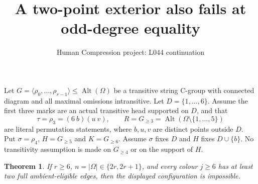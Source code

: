 \documentclass[11pt,a4paper]{article}
\title{A two-point exterior also fails at odd-degree equality}
\author{Human Compression project: L044 continuation}
\date{}
\newtheorem{theorem}{Theorem}
\newcommand{\gen}[1]{\langle#1\rangle}
\newcommand{\Alt}{\operatorname{Alt}}
\begin{document}
\maketitle
Let $G=\gen{\rho_0,\ldots,\rho_{r-1}}\le\Alt(\Omega)$
be a transitive string C-group with connected diagram and all
maximal omissions intransitive. Let $D=\{1,\ldots,6\}$.
Assume the first three marks are an actual transitive head
supported on $D$, and that
\[
 \tau=\rho_3=(6\ b)(u\ v),\qquad
 R=G_{\ge3}=\Alt(\Omega\setminus\{1,\ldots,5\})
\]
are literal permutation statements, where $b,u,v$ are distinct
points outside $D$. Put $\sigma=\rho_4$, $H=G_{\ge5}$
and $K=G_{\ge6}$. Assume $\sigma$ fixes $D$ and $H$ fixes
$D\cup\{b\}$. No transitivity assumption is made on
$G_{\ge4}$ or on the support of $H$.

\begin{theorem}
If $r\ge6$, $n=|\Omega|\in\{2r,2r+1\}$, and every
colour $j\ge6$ has at least two full ambient-eligible edges,
then the displayed configuration is impossible.
\end{theorem}
\end{document}
